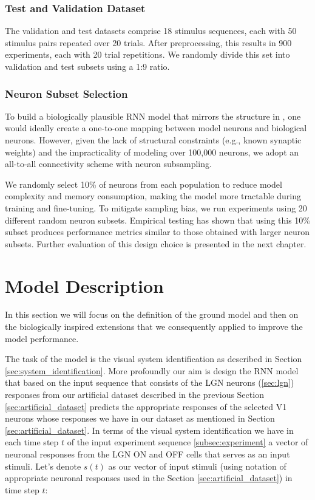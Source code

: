 \subsubsection{Test and Validation Dataset}
\label{subsubsec:test_dataset}

The validation and test datasets comprise 18 stimulus sequences, each with 50 stimulus pairs repeated over 20 trials. After preprocessing, this results in 900 experiments, each with 20 trial repetitions. We randomly divide this set into validation and test subsets using a 1:9 ratio.

\subsubsection{Neuron Subset Selection}
\label{subsubsec:subset_selection}

To build a biologically plausible RNN model that mirrors the structure in \citet{antolik2024comprehensive}, one would ideally create a one-to-one mapping between model neurons and biological neurons. However, given the lack of structural constraints (e.g., known synaptic weights) and the impracticality of modeling over 100,000 neurons, we adopt an all-to-all connectivity scheme with neuron subsampling.

We randomly select 10\% of neurons from each population to reduce model complexity and memory consumption, making the model more tractable during training and fine-tuning. To mitigate sampling bias, we run experiments using 20 different random neuron subsets. Empirical testing has shown that using this 10\% subset produces performance metrics similar to those obtained with larger neuron subsets. Further evaluation of this design choice is presented in the next chapter.

\section{Model Description}
\label{sec:model_description}

In this section we will focus on the definition of the ground model and then on the biologically inspired extensions that we consequently applied to improve the model performance.

The task of the model is the visual system identification as described in Section \ref{sec:system_identification}. More profoundly our aim is design the RNN model that based on the input sequence that consists of the LGN neurons (\ref{sec:lgn}) responses from our artificial dataset described in the previous Section \ref{sec:artificial_dataset} predicts the appropriate responses of the selected V1 neurons whose responses we have in our dataset as mentioned in Section \ref{sec:artificial_dataset}. In terms of the visual system identification we have in each time step $t$ of the input experiment sequence \ref{subsec:experiment} a vector of neuronal responses from the LGN ON and OFF cells that serves as an input stimuli. Let's denote $s(t)$ as our vector of input stimuli (using notation of appropriate neuronal responses used in the Section \ref{sec:artificial_dataset}) in time step $t$: 


